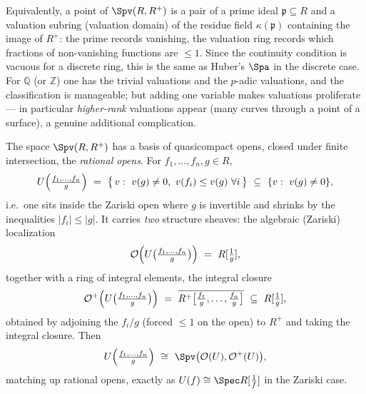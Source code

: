 \begin{remark}
\label{rmk:9:spv-second}
Equivalently, a point of $\Spv(R,R^{+})$ is a pair of a prime ideal
$\mathfrak p\subseteq R$ and a valuation subring (valuation domain) of the
residue field $\kappa(\mathfrak p)$ containing the image of $R^{+}$: the prime
records vanishing, the valuation ring records which fractions of non-vanishing
functions are $\le 1$. Since the continuity condition is vacuous for a discrete
ring, this is the same as Huber's $\Spa$ in the discrete case. For $\mathbb Q$
(or $\mathbb Z$) one has the trivial valuations and the $p$-adic valuations, and
the classification is manageable; but adding one variable makes valuations
proliferate --- in particular \emph{higher-rank} valuations appear (many curves
through a point of a surface), a genuine additional complication.
\end{remark}

\begin{definition}
\label{def:9:rational-open}
The space $\Spv(R,R^{+})$ has a basis of quasicompact opens, closed under finite
intersection, the \emph{rational opens}. For $f_{1},\dots,f_{n},g\in R$,
\begin{equation*}
U\Bigl(\tfrac{f_{1},\dots,f_{n}}{g}\Bigr)\ =\ \bigl\{\,v:\ v(g)\neq 0,\ v(f_{i})\le
v(g)\ \forall i\,\bigr\}\ \subseteq\ \{v:\ v(g)\neq 0\},
\end{equation*}
i.e.\ one sits inside the Zariski open where $g$ is invertible and shrinks by the
inequalities $|f_{i}|\le|g|$. It carries \emph{two} structure sheaves: the
algebraic (Zariski) localization
\begin{equation*}
\mathcal O\Bigl(U\bigl(\tfrac{f_{1},\dots,f_{n}}{g}\bigr)\Bigr)\ =\ R[\tfrac1g],
\end{equation*}
together with a ring of integral elements, the integral closure
\begin{equation*}
\mathcal O^{+}\Bigl(U\bigl(\tfrac{f_{1},\dots,f_{n}}{g}\bigr)\Bigr)\ =\
\overline{R^{+}\bigl[\tfrac{f_{1}}{g},\dots,\tfrac{f_{n}}{g}\bigr]}\ \subseteq\
R[\tfrac1g],
\end{equation*}
obtained by adjoining the $f_{i}/g$ (forced $\le 1$ on the open) to $R^{+}$ and
taking the integral closure. Then
\begin{equation}
\label{eq:9:rational-recursive}
U\Bigl(\tfrac{f_{1},\dots,f_{n}}{g}\Bigr)\ \cong\ \Spv\bigl(\mathcal O(U),
\mathcal O^{+}(U)\bigr),
\end{equation}
matching up rational opens, exactly as $U(f)\cong\Spec R[\tfrac1f]$ in the
Zariski case.
\end{definition}

